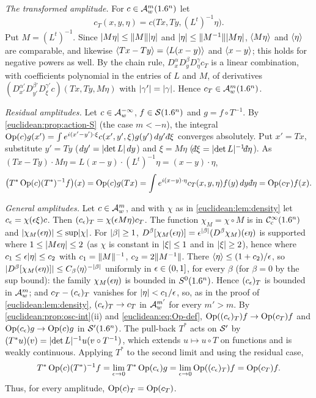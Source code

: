 \emph{The transformed amplitude.} For $c\in\mathcal{A}^{m}_{w}(1.6^n)$ let
\begin{equation*}
  c_T(x,y,\eta)=c\bigl(Tx,Ty,(L^t)^{-1}\eta\bigr).
\end{equation*}
Put $M=(L^t)^{-1}$. Since $\lvert M\eta\rvert\le\lVert M\rVert\lvert \eta\rvert$ and $\lvert \eta\rvert\le\lVert M^{-1}\rVert\lvert M\eta\rvert$,
$\langle M\eta\rangle$ and $\langle \eta\rangle$ are comparable, and likewise $\langle T x-Ty\rangle=\langle L(x-y)\rangle$ and
$\langle x-y\rangle$; this holds for negative powers as well. By the chain rule,
$D^\alpha_xD^\beta_yD^\gamma_\eta c_T$ is a linear combination, with coefficients
polynomial in the entries of $L$ and $M$, of derivatives
$(D^{\alpha'}_{x'}D^{\beta'}_{y'}D^{\gamma'}_\xi c)(Tx,Ty,M\eta)$ with $\lvert \gamma'\rvert=\lvert \gamma\rvert$.
Hence $c_T\in\mathcal{A}^{m}_{w}(1.6^n)$.

\emph{Residual amplitudes.} Let $c\in\mathcal{A}^{-\infty}_{w}$, $f\in\mathcal{S}(1.6^n)$ and
$g=f\circ T^{-1}$. By \cref{euclidean:prop:action-S} (the case $m<-n$), the integral
$\Op(c)g(x')=\int e^{i(x'-y')\cdot\xi}c(x',y',\xi)g(y')\,dy'\,\dbar\xi$ converges
absolutely. Put $x'=Tx$, substitute $y'=Ty$ ($dy'=\lvert \det L\rvert\,dy$) and $\xi=M\eta$
($\dbar\xi=\abs{\det L}^{-1}\dbar\eta$). As $(Tx-Ty)\cdot M\eta=L(x-y)\cdot(L^t)^{-1}\eta=(x-y)\cdot\eta$,
\begin{equation*}
  \bigl(T^*\Op(c)(T^*)^{-1}f\bigr)(x)=\Op(c)g(Tx)
  =\int e^{i(x-y)\cdot\eta}c_T(x,y,\eta)f(y)\,dy\,\dbar\eta=\Op(c_T)f(x).
\end{equation*}

\emph{General amplitudes.} Let $c\in\mathcal{A}^{m}_{w}$, and with $\chi$ as in
\cref{euclidean:lem:density} let $c_\epsilon=\chi(\epsilon\xi)c$. Then
$(c_\epsilon)_T=\chi(\epsilon M\eta)c_T$. The function $\chi_M=\chi\circ M$ is in $\mathcal{C}^\infty_{\mathrm{c}}(1.6^n)$
and $\lvert \chi_M(\epsilon\eta)\rvert\le\sup\lvert \chi\rvert$. For $\lvert \beta\rvert\ge1$,
$D^\beta[\chi_M(\epsilon\eta)]=\epsilon^{\lvert \beta\rvert}(D^\beta\chi_M)(\epsilon\eta)$ is supported where
$1\le\lvert M\epsilon\eta\rvert\le2$ (as $\chi$ is constant in $\lvert \xi\rvert\le1$ and in $\lvert \xi\rvert\ge2$),
hence where $c_1\le\epsilon\lvert \eta\rvert\le c_2$ with
$c_1=\lVert M\rVert^{-1}$, $c_2=2\lVert M^{-1}\rVert$. There $\langle \eta\rangle\le(1+c_2)/\epsilon$, so
$\lvert D^\beta[\chi_M(\epsilon\eta)]\rvert\le C_\beta\langle \eta\rangle^{-\lvert \beta\rvert}$ uniformly in
$\epsilon\in(0,1]$, for every $\beta$ (for $\beta=0$ by the sup bound): the family $\chi_M(\epsilon\eta)$ is bounded in $S^0(1.6^n)$. Hence
$(c_\epsilon)_T$ is bounded in $\mathcal{A}^{m}_{w}$; and $c_T-(c_\epsilon)_T$ vanishes for
$\lvert \eta\rvert<c_1/\epsilon$, so, as in the proof of \cref{euclidean:lem:density},
$(c_\epsilon)_T\to c_T$ in $\mathcal{A}^{m'}_{w}$ for every $m'>m$. By
\cref{euclidean:prop:osc-int}(ii) and \eqref{euclidean:eq:Op-def},
$\operatorname{Op}((c_\epsilon)_T)f\to\operatorname{Op}(c_T)f$ and $\operatorname{Op}(c_\epsilon)g\to\operatorname{Op}(c)g$ in $\mathcal{S}'(1.6^n)$. The pull-back
$T^*$ acts on $\mathcal{S}'$ by $(T^*u)(v)=\lvert \det L\rvert^{-1}u(v\circ T^{-1})$, which extends
$u\mapsto u\circ T$ on functions and is weakly continuous. Applying $T^*$ to the second
limit and using the residual case,
\begin{equation*}
  T^*\operatorname{Op}(c)(T^*)^{-1}f=\lim_{\epsilon\to0}T^*\operatorname{Op}(c_\epsilon)g=\lim_{\epsilon\to0}\operatorname{Op}((c_\epsilon)_T)f=\operatorname{Op}(c_T)f .
\end{equation*}
Thus, for every amplitude, $\operatorname{Op}(c)_T=\operatorname{Op}(c_T)$.

